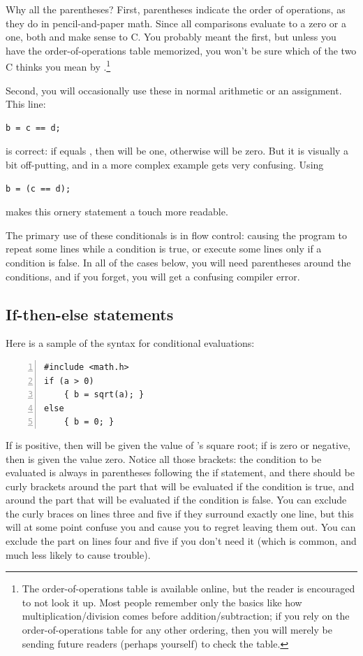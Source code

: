 Why all the parentheses? First, parentheses indicate the order of
operations, as they do in pencil-and-paper math. Since all comparisons
evaluate to a zero or a one, both 
and  make sense to C. You probably meant
the first, but unless you have the order-of-operations table memorized,
you won't be sure which of the two C thinks you mean by .\footnote{The order-of-operations table is available
online, but the reader is encouraged to not look it up. Most
people remember only the basics like how multiplication/division comes before
addition/subtraction; if you rely on the order-of-operations table
for any other ordering, then you will merely be sending future readers
(perhaps yourself) to check the table.}

Second, you will occasionally use these in normal arithmetic or an assignment. This line:
\begin{lstlisting}
b = c == d;
\end{lstlisting}
is correct: if  equals , then  will be one, otherwise  will be zero. But
it is visually a bit off-putting, and in a more complex example gets very confusing. Using
\begin{lstlisting}
b = (c == d);
\end{lstlisting}
makes this ornery statement a touch more readable.

The primary use of these conditionals is in flow control: causing
the program to repeat some lines while a condition is true, or execute some lines only if a condition is
false.  In all of the cases below, you will need parentheses around the conditions, and if you forget,
you will get a confusing compiler error.

\subsection{If-then-else statements} Here is a sample of the syntax for conditional evaluations: 

\begin{lstlisting}[numbers=left, numberstyle=\scshape]
#include <math.h>
if (a > 0)
    { b = sqrt(a); }
else 
    { b = 0; }
\end{lstlisting}
If  is positive, then  will be given the value of 's square root; if  is
zero or negative, then  is given the value zero. Notice all those brackets: the condition to be
evaluated is always in parentheses following the if statement, and there should be curly brackets around
the part that will be evaluated if the condition is true, and around the part that will be evaluated if
the condition is false. You can exclude the curly braces on lines three
and five if they surround exactly one line, but this will at some point
confuse you and cause you to regret leaving them out.  You can exclude
the  part on lines four and five if you don't need it (which is common, and much less
likely to cause trouble).

